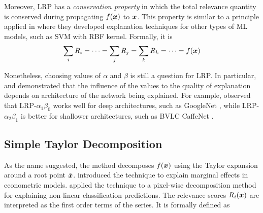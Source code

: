 Moreover, LRP  has a \textit{conservation property} in which the total relevance quantity is conserved during propagating $f(\patvector{x})$ to $\boldsymbol{x}$. This property is similar to a principle applied in \citep{PoulinVisualExplanationEvidence2006,LandeckerInterpretingindividualclassifications2013} where they developed explanation techniques for other types of ML models, such as SVM with RBF kernel. Formally, it is 
\begin{align*}
	\sum_{i} R_i =  \cdots =	\sum_{j} R_j = \sum_{k} R_k = \cdots = f(\patvector{x})
\end{align*}

Nonetheless, choosing values of $\alpha$ and $\beta$ is still a question for LRP.  In particular, \citet{MontavonExplainingnonlinearclassification2017} and \citet{BinderLayerWiseRelevancePropagation2016} demonstrated that the influence of the values to the quality of explanation  depends on architecture of the network being explained. For example, \cite{MontavonMethodsinterpretingunderstanding2018} observed that LRP-${\alpha_1\beta_0}$ works well for deep architectures, such as GoogleNet \citep{SzegedyGoingdeeperconvolutions2015}, while LRP-${\alpha_2\beta_1}$ is better for shallower architectures, such as BVLC CaffeNet \citep{JiaCaffeConvolutionalArchitecture2014}.

\subsection{Simple Taylor Decomposition}
As the name suggested,  the method decomposes $f(\patvector{x})$ using the Taylor expansion around a root point $\tilde{\boldsymbol{x}}$. \citet{BazenTaylorDecompositionUnified2013} introduced  the technique to explain marginal effects in econometric models. \citet{BachPixelWiseExplanationsNonLinear2015} applied the technique to a pixel-wise decomposition method for explaining non-linear classification predictions. The relevance scores $R_i(\boldsymbol{x})$ are interpreted as the first order terms of the series. It is formally defined as 


